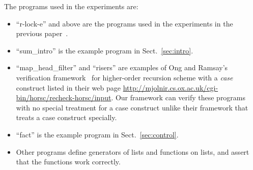 The programs used in the experiments are:
\begin{itemize}
\item ``r-lock-e'' and above are the programs used in the experiments in
      the previous paper~\cite{KobayashiPLDI2011}.
\item ``sum\_intro'' is the example program in Sect.~\ref{sec:intro}.
\item ``map\_head\_filter'' and ``risers'' are examples of Ong and
      Ramsay's verification framework~\cite{Ong2011} for higher-order
      recursion scheme with a \textit{case} construct listed in their
      web page
      \url{http://mjolnir.cs.ox.ac.uk/cgi-bin/horsc/recheck-horsc/input}.
      Our framework can verify these programs with no special treatment
      for a case construct unlike their framework that treats a case construct specially.
\item ``fact'' is the example program in Sect.~\ref{sec:control}.
\item Other programs define generators of lists and functions on lists,
      and assert that the functions work correctly.
\end{itemize}
